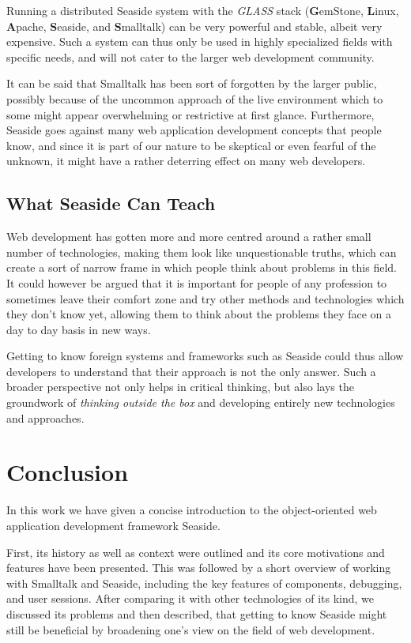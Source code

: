 \documentclass[a4paper,12pt,pagesize,headsepline,titlepage]{scrartcl}
\begin{document}
Running a distributed Seaside system with the \emph{GLASS} stack (\textbf{G}emStone, \textbf{L}inux, \textbf{A}pache, \textbf{S}easide, and \textbf{S}malltalk) can be very powerful and stable, albeit very expensive. Such a system can thus only be used in highly specialized fields with specific needs, and will not cater to the larger web development community.

It can be said that Smalltalk has been sort of forgotten by the larger public, possibly because of the uncommon approach of the live environment which to some might appear overwhelming or restrictive at first glance. Furthermore, Seaside goes against many web application development concepts that people know, and since it is part of our nature to be skeptical or even fearful of the unknown, it might have a rather deterring effect on many web developers.


\subsection{What Seaside Can Teach}

Web development has gotten more and more centred around a rather small number of technologies, making them look like unquestionable truths, which can create a sort of narrow frame in which people think about problems in this field. 
It could however be argued that it is important for people of any profession to sometimes leave their comfort zone and try other methods and technologies which they don't know yet, allowing them to think about the problems they face on a day to day basis in new ways.

Getting to know foreign systems and frameworks such as Seaside could thus allow developers to understand that their approach is not the only answer. Such a broader perspective not only helps in critical thinking, but also lays the groundwork of \emph{thinking outside the box} and developing entirely new technologies and approaches.

\section{Conclusion}
\label{sec:conclusion}

In this work we have given a concise introduction to the object-oriented web application development framework Seaside. 

First, its history as well as context were outlined and its core motivations and features have been presented. This was followed by a short overview of working with Smalltalk and Seaside, including the key features of components, debugging, and user sessions. After comparing it with other technologies of its kind, we discussed its problems and then described, that getting to know Seaside might still be beneficial by broadening one's view on the field of web development.


\newpage
\printbibliography
\end{document}
